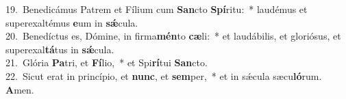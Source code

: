 {19.~}Benedicámus Patrem et Fílium cum \textbf{San}cto \textbf{Spí}ritu:~* laudémus et superexaltémus \textbf{e}um in \textbf{sǽ}cula.\\
{20.~}Benedíctus es, Dómine, in firma\textbf{mén}to \textbf{cæ}li:~* et laudábilis, et gloriósus, et superexal\textbf{tá}tus in \textbf{sǽ}cula.\\
{21.~}Glória \textbf{Pa}tri, et \textbf{Fí}lio,~* et Spi\textbf{rí}tui \textbf{San}cto.\\
{22.~}Sicut erat in princípio, et \textbf{nunc}, et \textbf{sem}per,~* et in sǽcula sæcu\textbf{ló}rum. \textbf{A}men.\\

